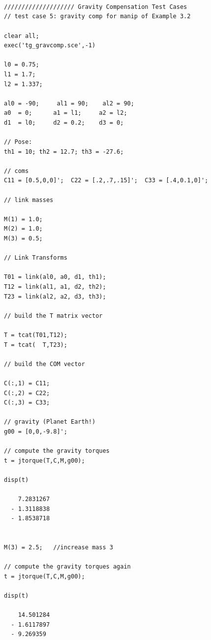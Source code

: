 \documentclass{article}
\begin{document}
\begin{verbatim}



//////////////////// Gravity Compensation Test Cases
// test case 5: gravity comp for manip of Example 3.2

clear all;
exec('tg_gravcomp.sce',-1)
 
l0 = 0.75;
l1 = 1.7;
l2 = 1.337;

al0 = -90;     al1 = 90;    al2 = 90;
a0  = 0;      a1 = l1;     a2 = l2;
d1  = l0;     d2 = 0.2;    d3 = 0;

// Pose: 
th1 = 10; th2 = 12.7; th3 = -27.6;

// coms
C11 = [0.5,0,0]';  C22 = [.2,.7,.15]';  C33 = [.4,0.1,0]';

// link masses

M(1) = 1.0;
M(2) = 1.0;
M(3) = 0.5;

// Link Transforms

T01 = link(al0, a0, d1, th1);
T12 = link(al1, a1, d2, th2);
T23 = link(al2, a2, d3, th3);

// build the T matrix vector

T = tcat(T01,T12);
T = tcat(  T,T23);

// build the COM vector

C(:,1) = C11;
C(:,2) = C22;
C(:,3) = C33;

// gravity (Planet Earth!)
g00 = [0,0,-9.8]';

// compute the gravity torques
t = jtorque(T,C,M,g00);

disp(t)

    7.2831267  
  - 1.3118838  
  - 1.8538718  
 

M(3) = 2.5;   //increase mass 3 

// compute the gravity torques again
t = jtorque(T,C,M,g00);

disp(t)

    14.501284  
  - 1.6117897  
  - 9.269359   
 
\end{verbatim}
\end{document}
